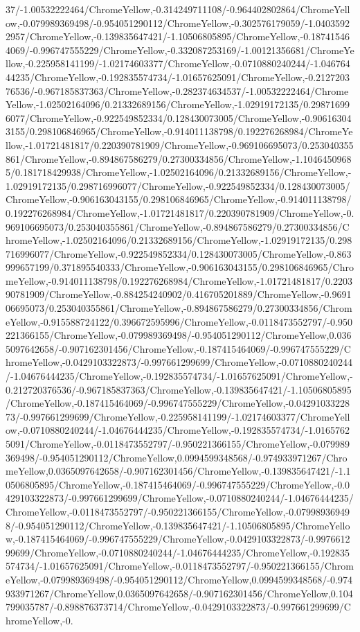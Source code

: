 {\begin{tikzternal}
{37/-1.00532222464/ChromeYellow,-0.314249711108/-0.964402802864/ChromeYellow,-0.079989369498/-0.954051290112/ChromeYellow,-0.302576179059/-1.04035922957/ChromeYellow,-0.139835647421/-1.10506805895/ChromeYellow,-0.187415464069/-0.996747555229/ChromeYellow,-0.332087253169/-1.00121356681/ChromeYellow,-0.225958141199/-1.02174603377/ChromeYellow,-0.0710880240244/-1.04676444235/ChromeYellow,-0.192835574734/-1.01657625091/ChromeYellow,-0.212720376536/-0.967185837363/ChromeYellow,-0.282374634537/-1.00532222464/ChromeYellow,-1.02502164096/0.21332689156/ChromeYellow,-1.02919172135/0.298716996077/ChromeYellow,-0.922549852334/0.128430073005/ChromeYellow,-0.906163043155/0.298106846965/ChromeYellow,-0.914011138798/0.192276268984/ChromeYellow,-1.01721481817/0.220390781909/ChromeYellow,-0.969106695073/0.253040355861/ChromeYellow,-0.894867586279/0.27300334856/ChromeYellow,-1.10464509685/0.181718429938/ChromeYellow,-1.02502164096/0.21332689156/ChromeYellow,-1.02919172135/0.298716996077/ChromeYellow,-0.922549852334/0.128430073005/ChromeYellow,-0.906163043155/0.298106846965/ChromeYellow,-0.914011138798/0.192276268984/ChromeYellow,-1.01721481817/0.220390781909/ChromeYellow,-0.969106695073/0.253040355861/ChromeYellow,-0.894867586279/0.27300334856/ChromeYellow,-1.02502164096/0.21332689156/ChromeYellow,-1.02919172135/0.298716996077/ChromeYellow,-0.922549852334/0.128430073005/ChromeYellow,-0.863999657199/0.371895540333/ChromeYellow,-0.906163043155/0.298106846965/ChromeYellow,-0.914011138798/0.192276268984/ChromeYellow,-1.01721481817/0.220390781909/ChromeYellow,-0.884254240902/0.416705201889/ChromeYellow,-0.969106695073/0.253040355861/ChromeYellow,-0.894867586279/0.27300334856/ChromeYellow,-0.915588724122/0.396672595996/ChromeYellow,-0.0118473552797/-0.950221366155/ChromeYellow,-0.079989369498/-0.954051290112/ChromeYellow,0.0365097642658/-0.907162301456/ChromeYellow,-0.187415464069/-0.996747555229/ChromeYellow,-0.0429103322873/-0.997661299699/ChromeYellow,-0.0710880240244/-1.04676444235/ChromeYellow,-0.192835574734/-1.01657625091/ChromeYellow,-0.212720376536/-0.967185837363/ChromeYellow,-0.139835647421/-1.10506805895/ChromeYellow,-0.187415464069/-0.996747555229/ChromeYellow,-0.0429103322873/-0.997661299699/ChromeYellow,-0.225958141199/-1.02174603377/ChromeYellow,-0.0710880240244/-1.04676444235/ChromeYellow,-0.192835574734/-1.01657625091/ChromeYellow,-0.0118473552797/-0.950221366155/ChromeYellow,-0.079989369498/-0.954051290112/ChromeYellow,0.0994599348568/-0.974933971267/ChromeYellow,0.0365097642658/-0.907162301456/ChromeYellow,-0.139835647421/-1.10506805895/ChromeYellow,-0.187415464069/-0.996747555229/ChromeYellow,-0.0429103322873/-0.997661299699/ChromeYellow,-0.0710880240244/-1.04676444235/ChromeYellow,-0.0118473552797/-0.950221366155/ChromeYellow,-0.079989369498/-0.954051290112/ChromeYellow,-0.139835647421/-1.10506805895/ChromeYellow,-0.187415464069/-0.996747555229/ChromeYellow,-0.0429103322873/-0.997661299699/ChromeYellow,-0.0710880240244/-1.04676444235/ChromeYellow,-0.192835574734/-1.01657625091/ChromeYellow,-0.0118473552797/-0.950221366155/ChromeYellow,-0.079989369498/-0.954051290112/ChromeYellow,0.0994599348568/-0.974933971267/ChromeYellow,0.0365097642658/-0.907162301456/ChromeYellow,0.104799035787/-0.898876373714/ChromeYellow,-0.0429103322873/-0.997661299699/ChromeYellow,-0.}
\end{tikzternal}}

